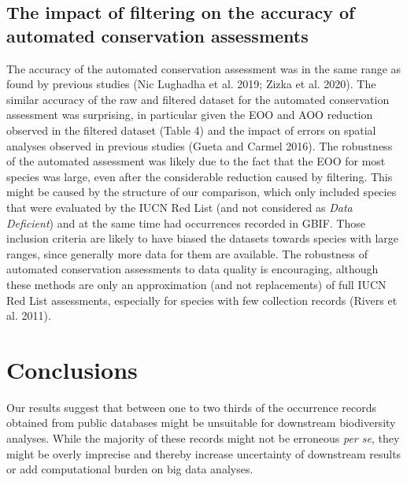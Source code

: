 \documentclass[fleqn,10pt,lineno]{wlpeerj} %
\begin{document}
\hypertarget{the-impact-of-filtering-on-the-accuracy-of-automated-conservation-assessments}{%
\subsection*{The impact of filtering on the accuracy of automated conservation assessments}\label{the-impact-of-filtering-on-the-accuracy-of-automated-conservation-assessments}}

The accuracy of the automated conservation assessment was in the same range as found by previous studies (Nic Lughadha et al. 2019; Zizka et al. 2020). The similar accuracy of the raw and filtered dataset for the automated conservation assessment was surprising, in particular given the EOO and AOO reduction observed in the filtered dataset (Table 4) and the impact of errors on spatial analyses observed in previous studies (Gueta and Carmel 2016). The robustness of the automated assessment was likely due to the fact that the EOO for most species was large, even after the considerable reduction caused by filtering. This might be caused by the structure of our comparison, which only included species that were evaluated by the IUCN Red List (and not considered as \emph{Data Deficient}) and at the same time had occurrences recorded in GBIF. Those inclusion criteria are likely to have biased the datasets towards species with large ranges, since generally more data for them are available. The robustness of automated conservation assessments to data quality is encouraging, although these methods are only an approximation (and not replacements) of full IUCN Red List assessments, especially for species with few collection records (Rivers et al. 2011).

\hypertarget{conclusions}{%
\section*{Conclusions}\label{conclusions}}

Our results suggest that between one to two thirds of the occurrence records obtained from public databases might be unsuitable for downstream biodiversity analyses. While the majority of these records might not be erroneous \emph{per se}, they might be overly imprecise and thereby increase uncertainty of downstream results or add computational burden on big data analyses.
\end{document}
